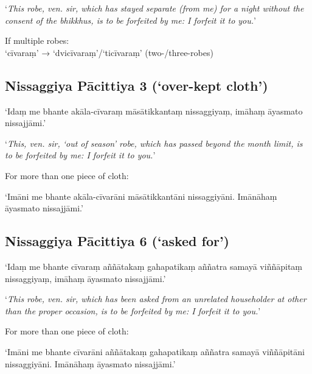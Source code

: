 ‘\emph{This robe, ven. sir, which has stayed separate (from me) for a night
  without the consent of the bhikkhus, is to be forfeited by me: I forfeit it to
  you.}’ 

If multiple robes:\\
‘cīvaraṃ’ → ‘dvicīvaraṃ’/‘ticīvaraṃ’ (two-/three-robes)

 
\subsection{Nissaggiya Pācittiya 3 (‘over-kept cloth’)}

‘Idaṃ me bhante akāla-cīvaraṃ māsātikkantaṃ nissaggiyaṃ, imāhaṃ āyasmato nissajjāmi.’

‘\emph{This, ven. sir, ‘out of season’ robe, which has passed beyond the month
  limit, is to be forfeited by me: I forfeit it to you.}’ 

For more than one piece of cloth:

‘Imāni me bhante akāla-cīvarāni māsātikkantāni nissaggiyāni. Imānāhaṃ āyasmato nissajjāmi.’


\subsection{Nissaggiya Pācittiya 6 (‘asked for’)}

‘Idaṃ me bhante cīvaraṃ aññātakaṃ gahapatikaṃ aññatra samayā viññāpitaṃ
nissaggiyaṃ, imāhaṃ āyasmato nissajjāmi.’

‘\emph{This robe, ven. sir, which has been asked from an unrelated householder at
  other than the proper occasion, is to be forfeited by me: I forfeit it to you.}’

For more than one piece of cloth:

‘Imāni me bhante cīvarāni aññātakaṃ gahapatikaṃ aññatra samayā viññāpitāni
nissaggiyāni. Imānāhaṃ āyasmato nissajjāmi.’


